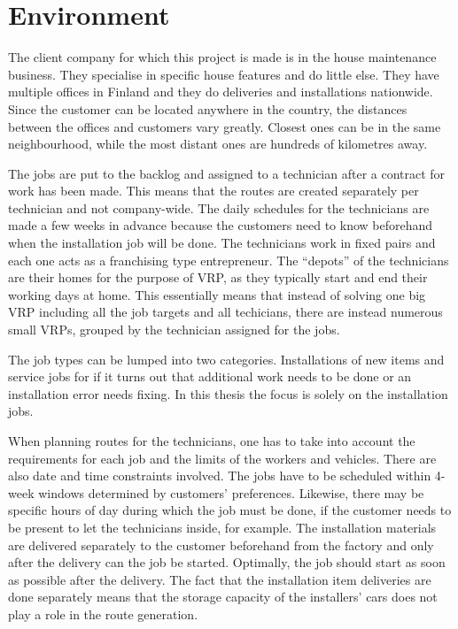 \chapter{Environment}
\label{chapter:environment}

The client company for which this project is made is in the house maintenance business. They specialise in specific house features and do little else. They have multiple offices in Finland and they do deliveries and installations nationwide. Since the customer can be located anywhere in the country, the distances between the offices and customers vary greatly. Closest ones can be in the same neighbourhood, while the most distant ones are hundreds of kilometres away.

The jobs are put to the backlog and assigned to a technician after a contract for work has been made. This means that the routes are created separately per technician and not company-wide. The daily schedules for the technicians are made a few weeks in advance because the customers need to know beforehand when the installation job will be done. The technicians work in fixed pairs and each one acts as a franchising type entrepreneur. The ``depots'' of the technicians are their homes for the purpose of VRP, as they typically start and end their working days at home. This essentially means that instead of solving one big VRP including all the job targets and all techicians, there are instead numerous small VRPs, grouped by the technician assigned for the jobs. 

The job types can be lumped into two categories. Installations of new items and service jobs for if it turns out that additional work needs to be done or an installation error needs fixing. In this thesis the focus is solely on the installation jobs.

When planning routes for the technicians, one has to take into account the requirements for each job and the limits of the workers and vehicles. There are also date and time constraints involved. The jobs have to be scheduled within 4-week windows determined by customers' preferences. Likewise, there may be specific hours of day during which the job must be done, if the customer needs to be present to let the technicians inside, for example. The installation materials are delivered separately to the customer beforehand from the factory and only after the delivery can the job be started. Optimally, the job should start as soon as possible after the delivery. The fact that the installation item deliveries are done separately means that the storage capacity of the installers' cars does not play a role in the route generation. 

